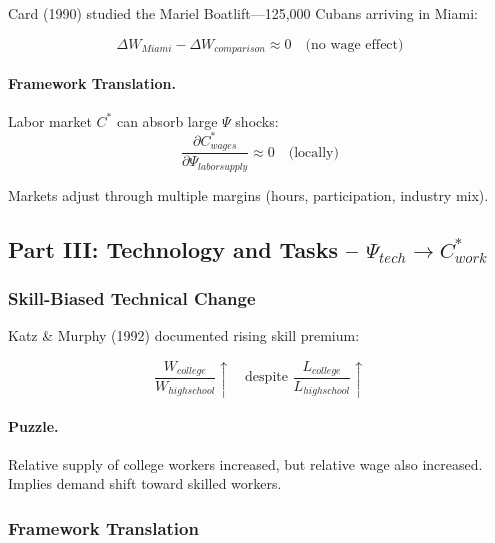 Card (1990) studied the Mariel Boatlift---125,000 Cubans arriving in Miami:

\begin{equation}
\boxed{
\Delta W_{Miami} - \Delta W_{comparison} \approx 0 \quad \text{(no wage effect)}
}
\label{eq:mariel}
\end{equation}

\paragraph{Framework Translation.}
Labor market $C^*$ can absorb large $\Psi$ shocks:
\begin{equation}
\frac{\partial C^*_{wages}}{\partial \Psi_{labor supply}} \approx 0 \quad \text{(locally)}
\end{equation}

Markets adjust through multiple margins (hours, participation, industry mix).

\subsection{Part III: Technology and Tasks – $\Psi_{tech} \to C^*_{work}$}

\subsubsection{Skill-Biased Technical Change}

Katz \& Murphy (1992) documented rising skill premium:

\begin{equation}
\boxed{
\frac{W_{college}}{W_{high school}} \uparrow \quad \text{despite } \frac{L_{college}}{L_{high school}} \uparrow
}
\label{eq:skill-premium}
\end{equation}

\paragraph{Puzzle.}
Relative supply of college workers increased, but relative wage also increased.
Implies demand shift toward skilled workers.

\subsubsection{Framework Translation}

